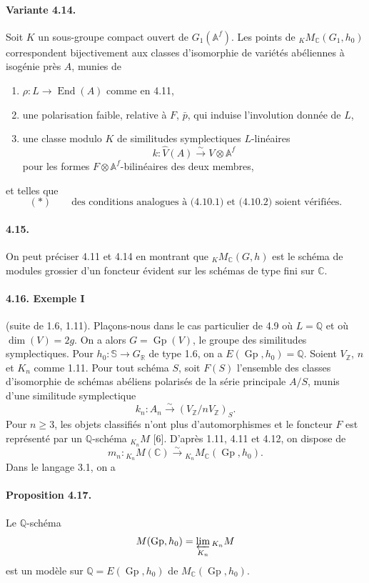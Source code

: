 \documentclass[10pt]{article}
\newcommand{\Af}{\mathbb A^f}
\newcommand{\C}{\mathbb C}
\newcommand{\Q}{\mathbb Q}
\newcommand{\R}{\mathbb R}
\newcommand{\Z}{\mathbb Z}
\newcommand{\bS}{\mathbb S}
\newcommand{\Gp}{\operatorname{Gp}}
\newcommand{\End}{\operatorname{End}}
\begin{document}
\paragraph{Variante 4.14.} Soit $K$ un sous-groupe compact ouvert de $G_1(\Af)$. Les points de ${}_K M_{\C}(G_1,h_0)$ correspondent bijectivement aux classes d'isomorphie de variétés abéliennes à isogénie près $A$, munies de
\begin{enumerate}[label=(\alph*)]
\item $\rho:L\longrightarrow\End(A)$ comme en 4.11,
\item une polarisation faible, relative à $F$, $\bar p$, qui induise l'involution donnée de $L$,
\item une classe modulo $K$ de similitudes symplectiques $L$-linéaires
\[
k:\widehat V(A)\xrightarrow{\sim}V\otimes\Af
\]
pour les formes $F\otimes\Af$-bilinéaires des deux membres,
\end{enumerate}
et telles que
\[
(*)\qquad\text{des conditions analogues à (4.10.1) et (4.10.2) soient vérifiées.}
\]

\paragraph{4.15.} On peut préciser 4.11 et 4.14 en montrant que ${}_K M_{\C}(G,h)$ est le schéma de modules grossier d'un foncteur évident sur les schémas de type fini sur $\C$.

\paragraph{4.16. Exemple I} (suite de 1.6, 1.11). Plaçons-nous dans le cas particulier de 4.9 où $L=\Q$ et où $\dim(V)=2g$. On a alors $G=\Gp(V)$, le groupe des similitudes symplectiques. Pour $h_0:\bS\to G_\R$ de type 1.6, on a $E(\Gp,h_0)=\Q$. Soient $V_\Z$, $n$ et $K_n$ comme 1.11. Pour tout schéma $S$, soit $F(S)$ l'ensemble des classes d'isomorphie de schémas abéliens polarisés de la série principale $A/S$, munis d'une similitude symplectique
\[
k_n:A_n\xrightarrow{\sim}(V_\Z/nV_\Z)_S.
\]
Pour $n\ge3$, les objets classifiés n'ont plus d'automorphismes et le foncteur $F$ est représenté par un $\Q$-schéma ${}_{K_n}M$ [6]. D'après 1.11, 4.11 et 4.12, on dispose de
\[
m_n:{}_{K_n}M(\C)\xrightarrow{\sim}{}_{K_n}M_{\C}(\Gp,h_0).
\]
Dans le langage 3.1, on a

\paragraph{Proposition 4.17.} Le $\Q$-schéma
\[
M(\Gp,h_0)=\varprojlim_{K_n}{}_{K_n}M
\]
est un modèle sur $\Q=E(\Gp,h_0)$ de $M_{\C}(\Gp,h_0)$.
\end{document}
